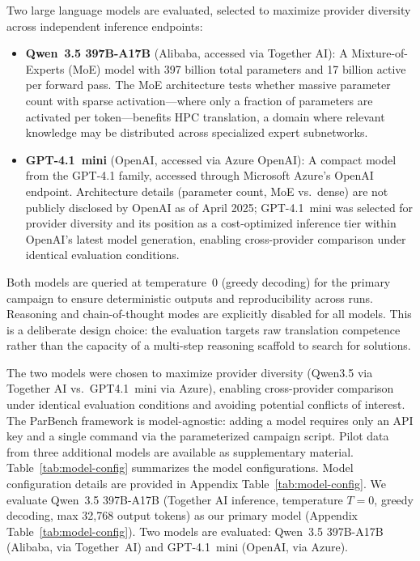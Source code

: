 \documentclass[conference]{IEEEtran}
\begin{document}
Two large language models are evaluated, selected to maximize provider diversity across independent inference endpoints:

\begin{itemize}
\item \textbf{Qwen~3.5 397B-A17B} (Alibaba, accessed via Together AI): A Mixture-of-Experts (MoE) model with 397 billion total parameters and 17 billion active per forward pass. The MoE architecture tests whether massive parameter count with sparse activation---where only a fraction of parameters are activated per token---benefits HPC translation, a domain where relevant knowledge may be distributed across specialized expert subnetworks.

\item \textbf{GPT-4.1~mini} (OpenAI, accessed via Azure OpenAI): A compact model from the GPT-4.1 family, accessed through Microsoft Azure's OpenAI endpoint. Architecture details (parameter count, MoE vs.\ dense) are not publicly disclosed by OpenAI as of April 2025; GPT-4.1~mini was selected for provider diversity and its position as a cost-optimized inference tier within OpenAI's latest model generation, enabling cross-provider comparison under identical evaluation conditions.
\end{itemize}

Both models are queried at temperature~0 (greedy decoding) for the primary campaign to ensure deterministic outputs and reproducibility across runs. Reasoning and chain-of-thought modes are explicitly disabled for all models. This is a deliberate design choice: the evaluation targets raw translation competence rather than the capacity of a multi-step reasoning scaffold to search for solutions.

The two models were chosen to maximize provider diversity (Qwen3.5 via Together AI vs.\ GPT4.1~mini via Azure), enabling cross-provider comparison under identical evaluation conditions and avoiding potential conflicts of interest. The ParBench framework is model-agnostic: adding a model requires only an API key and a single command via the parameterized campaign script. Pilot data from three additional models are available as supplementary material. Table~\ref{tab:model-config} summarizes the model configurations.
Model configuration details are provided in Appendix Table~\ref{tab:model-config}.
We evaluate Qwen~3.5 397B-A17B (Together AI inference, temperature $T=0$,
greedy decoding, max 32{,}768 output tokens) as our primary model
(Appendix Table~\ref{tab:model-config}).
Two models are evaluated: Qwen~3.5 397B-A17B (Alibaba, via Together~AI) and GPT-4.1~mini (OpenAI, via Azure).
\end{document}
